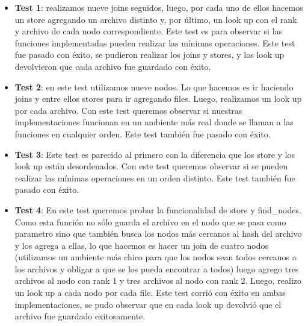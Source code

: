 \begin{itemize}

\item \textbf{Test 1}: realizamos nueve joins seguidos, luego, por cada uno de ellos hacemos un store agregando un archivo distinto y, por último, un look up con el rank y archivo de cada nodo correspondiente. Este test es para observar si las funciones implementadas pueden realizar las mínimas operaciones.
\newline Este test fue pasado con éxito, se pudieron realizar los joins y stores, y los look up devolvieron que cada archivo fue guardado con éxito.

\item \textbf{Test 2}: en este test utilizamos nueve nodos. Lo que hacemos es ir haciendo joins y entre ellos stores para ir agregando files. Luego, realizamos un look up por cada archivo. Con este test queremos observar si nuestras implementaciones funcionan en un ambiente más real donde se llaman a las funciones en cualquier orden.
\newline Este test también fue pasado con éxito.

\item \textbf{Test 3}: Este test es parecido al primero con la diferencia que los store y los look up están desordenados. Con este test queremos observar si se pueden realizar las mínimas operaciones en un orden distinto.
\newline Este test también fue pasado con éxito.

\item \textbf{Test 4}: En este test queremos probar la funcionalidad de store y find\_nodes. Como esta función no sólo guarda el archivo en el nodo que se pasa como parametro sino que también busca los nodos más cercanos al hash del archivo y los agrega a ellas, lo que hacemos es hacer un join de cuatro nodos (utilizamos un ambiente más chico para que los nodos sean todos cercanos a los archivos y obligar a que se los pueda encontrar a todos) luego agrego tres archivos al nodo con rank 1 y tres archivos al nodo con rank 2. Luego, realizo un look up a cada nodo por cada file.
\newline Este test corrió con éxito en ambas implementaciones, se pudo observar que en cada look up devolvió que el archivo fue guardado exitosamente.

\end{itemize}